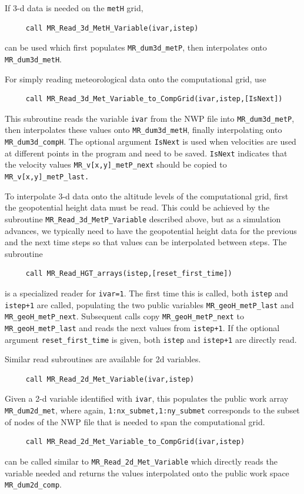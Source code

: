 \documentclass[11pt]{article}   %
\begin{document}
If 3-d data is needed on the \texttt{metH} grid,
\begin{verbatim}
     call MR_Read_3d_MetH_Variable(ivar,istep)
\end{verbatim}
can be used which first populates \texttt{MR\_dum3d\_metP}, then interpolates
onto \texttt{MR\_dum3d\_metH}.

For simply reading meteorological data onto the computational grid, use
\begin{verbatim}
     call MR_Read_3d_Met_Variable_to_CompGrid(ivar,istep,[IsNext])
\end{verbatim}
This subroutine reads the variable \texttt{ivar} from the NWP file into
\texttt{MR\_dum3d\_metP}, then interpolates these values onto \texttt{MR\_dum3d\_metH},
finally interpolating onto \texttt{MR\_dum3d\_compH}.  The optional argument
\texttt{IsNext} is used when velocities are used at different points in the program
and need to be saved.  \texttt{IsNext} indicates that the velocity values
\texttt{MR\_v[x,y]\_metP\_next} should be copied to \texttt{MR\_v[x,y]\_metP\_last.}

To interpolate 3-d data onto the altitude levels of the computational grid, first
the geopotential height data must be read.  This could be achieved by the subroutine
\texttt{MR\_Read\_3d\_MetP\_Variable} described above, but as a simulation advances, we
typically need to have the geopotential height data for the previous and the next time
steps so that values can be interpolated between steps.  The subroutine
\begin{verbatim}
     call MR_Read_HGT_arrays(istep,[reset_first_time])
\end{verbatim}
is a specialized reader for \texttt{ivar=1}.  The first time this is called, both
\texttt{istep} and \texttt{istep+1} are called, populating the two public variables
\texttt{MR\_geoH\_metP\_last} and \texttt{MR\_geoH\_metP\_next}.  Subsequent calls
copy \texttt{MR\_geoH\_metP\_next} to \texttt{MR\_geoH\_metP\_last} and reads
the next values from \texttt{istep+1}.  If the optional argument \texttt{reset\_first\_time}
is given, both \texttt{istep} and \texttt{istep+1} are directly read.


Similar read subroutines are available for 2d variables.
\begin{verbatim}
     call MR_Read_2d_Met_Variable(ivar,istep)
\end{verbatim}
Given a 2-d variable identified with \texttt{ivar}, this populates the public
work array \texttt{MR\_dum2d\_met}, where again,
\texttt{1:nx\_submet,1:ny\_submet} corresponds to the subset of nodes of the NWP
file that is needed to span the computational grid.
\begin{verbatim}
     call MR_Read_2d_Met_Variable_to_CompGrid(ivar,istep)
\end{verbatim}
can be called similar to \texttt{MR\_Read\_2d\_Met\_Variable} which directly reads the
variable needed and returns the
values interpolated onto the public work space \texttt{MR\_dum2d\_comp}.
\end{document}
